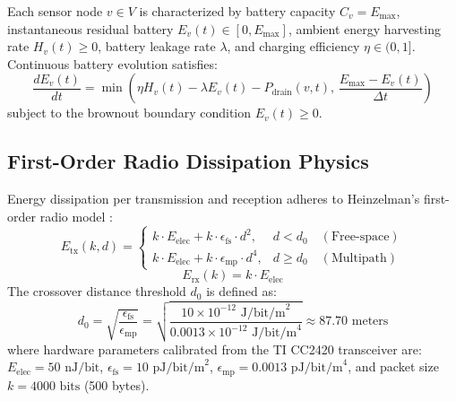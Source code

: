 \documentclass[journal]{IEEEtran}
\begin{document}
Each sensor node $v \in V$ is characterized by battery capacity $C_v = E_{\text{max}}$, instantaneous residual battery $E_v(t) \in [0, E_{\text{max}}]$, ambient energy harvesting rate $H_v(t) \ge 0$, battery leakage rate $\lambda$, and charging efficiency $\eta \in (0, 1]$. Continuous battery evolution satisfies:
\begin{equation}
\frac{dE_v(t)}{dt} = \min\left( \eta H_v(t) - \lambda E_v(t) - P_{\text{drain}}(v, t), \, \frac{E_{\text{max}} - E_v(t)}{\Delta t} \right)
\end{equation}
subject to the brownout boundary condition $E_v(t) \ge 0$.

\subsection{First-Order Radio Dissipation Physics}
Energy dissipation per transmission and reception adheres to Heinzelman's first-order radio model \cite{heinzelman2002application}:
\begin{equation}
E_{\text{tx}}(k, d) = \begin{cases} 
k \cdot E_{\text{elec}} + k \cdot \epsilon_{\text{fs}} \cdot d^2, & d < d_0 \quad (\text{Free-space}) \\ 
k \cdot E_{\text{elec}} + k \cdot \epsilon_{\text{mp}} \cdot d^4, & d \ge d_0 \quad (\text{Multipath}) 
\end{cases}
\end{equation}
\begin{equation}
E_{\text{rx}}(k) = k \cdot E_{\text{elec}}
\end{equation}
The crossover distance threshold $d_0$ is defined as:
\begin{equation}
d_0 = \sqrt{\frac{\epsilon_{\text{fs}}}{\epsilon_{\text{mp}}}} = \sqrt{\frac{10 \times 10^{-12}\text{ J/bit/m}^2}{0.0013 \times 10^{-12}\text{ J/bit/m}^4}} \approx 87.70\text{ meters}
\end{equation}
where hardware parameters calibrated from the TI CC2420 transceiver are: $E_{\text{elec}} = 50\text{ nJ/bit}$, $\epsilon_{\text{fs}} = 10\text{ pJ/bit/m}^2$, $\epsilon_{\text{mp}} = 0.0013\text{ pJ/bit/m}^4$, and packet size $k = 4000\text{ bits}$ (500 bytes).
\end{document}
